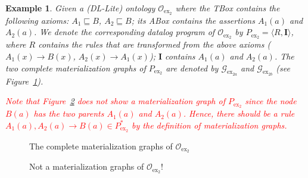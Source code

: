 \documentclass[final,1p,times]{elsarticle}
\newtheorem{example}{Example}
\begin{document}
\clearpage

\begin{example}\label{exp:dllite}
  Given a (DL-Lite) ontology $\mathcal{O}_{\text{ex}_2}$ where the TBox
  contains the following axioms: $A_1\sqsubseteq B$,
  $A_2\sqsubseteq B$; its ABox contains the assertions $A_1(a)$ and
  $A_2(a)$.  We denote the corresponding datalog program of
  $\mathcal{O}_{\text{ex}_2}$ by
  $P_{\text{ex}_2}=\langle R, \textbf{I}\rangle$, where $R$ contains the
  rules that are transformed from the above axioms ($A_1(x) \to B(x)$,
  $A_2(x) \to A_1(x)$); $\textbf{I}$ contains $A_1(a)$ and $A_2(a)$.
  The two complete materialization graphs of $P_{\text{ex}_2}$ are denoted by
  $\mathcal{G}_{\text{ex}_{2a}}$ and $\mathcal{G}_{\text{ex}_{2b}}$
  (see Figure~\ref{fig:ex2}).

  \textcolor{red}{Note that Figure~\ref{fig:ex2not} does not show a
    materialization graph of $P_{\text{ex}_2}$ since the node $B(a)$
    has the two parents $A_1(a)$ and $A_2(a)$. Hence, there should be
    a rule $A_1(a), A_2(a) \to B(a) \in P_{\text{ex}_2}^*$ by the
    definition of materialization graphs.}
\end{example}

\begin{figure}[htbp]
\centering
{}
\caption{The complete materialization graphs of $\mathcal{O}_{\text{ex}_2}$}
\label{fig:ex2}
\end{figure}

\begin{figure}[htbp]
\centering
{}
\caption{Not a materialization graphs of $\mathcal{O}_{\text{ex}_2}$!}
\label{fig:ex2not}
\end{figure}
\end{document}
